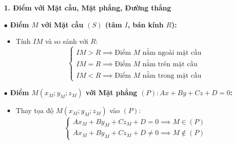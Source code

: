 \documentclass[12pt,a4paper]{article}
\begin{document}
\newpage


\vspace{0.1cm}

\begin{theorybox}
    \textbf{\textcolor{deepblue}{\large 1. Điểm với Mặt cầu, Mặt phẳng, Đường thẳng}}
    \par\vspace{6pt}

    \textbf{\textcolor{amberorange}{$\bullet$ Điểm $M$ với Mặt cầu $(S)$ (tâm $I$, bán kính $R$):}}
    \begin{itemize}
        \item Tính $IM$ và so sánh với $R$:
        \[
            \begin{cases}
                IM > R \implies \text{Điểm } M \text{ nằm ngoài mặt cầu} \\
                IM = R \implies \text{Điểm } M \text{ nằm trên mặt cầu} \\
                IM < R \implies \text{Điểm } M \text{ nằm trong mặt cầu}
            \end{cases}
        \]
    \end{itemize}

    \textbf{\textcolor{amberorange}{$\bullet$ Điểm $M(x_M; y_M; z_M)$ với Mặt phẳng $(P)\colon Ax + By + Cz + D = 0$:}}
    \begin{itemize}
        \item Thay tọa độ $M(x_M; y_M; z_M)$ vào $(P)$:
        \[
            \begin{cases}
                Ax_M + By_M + Cz_M + D = 0 \implies M \in (P) \\
                Ax_M + By_M + Cz_M + D \neq 0 \implies M \notin (P)
            \end{cases}
        \]
    \end{itemize}


\end{theorybox}
\end{document}
